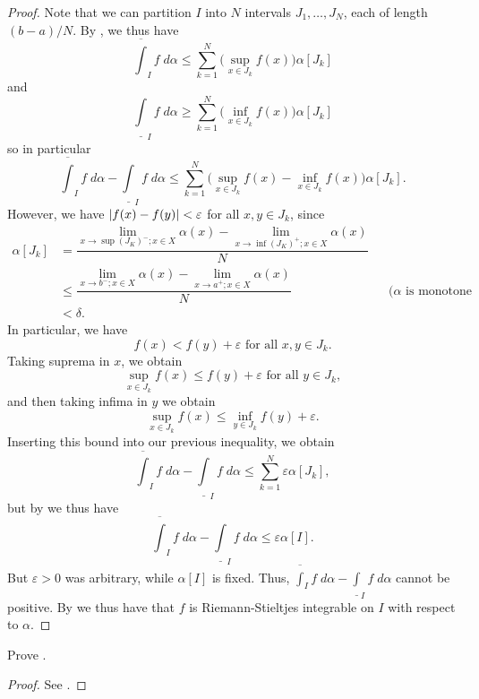 \begin{proof}
  Note that we can partition \(I\) into \(N\) intervals \(J_1, \dots, J_N\), each of length \((b - a) / N\).
  By , we thus have
  \[
    \overline{\int}_I f \; d \alpha \leq \sum_{k = 1}^N \big(\sup_{x \in J_k} f(x)\big) \alpha[J_k]
  \]
  and
  \[
    \underline{\int}_I f \; d \alpha \geq \sum_{k = 1}^N \big(\inf_{x \in J_k} f(x)\big) \alpha[J_k]
  \]
  so in particular
  \[
    \overline{\int}_I f \; d \alpha - \underline{\int}_I f \; d \alpha \leq \sum_{k = 1}^N \big(\sup_{x \in J_k} f(x) - \inf_{x \in J_k} f(x)\big) \alpha[J_k].
  \]
  However, we have \(\left\lvert f(x) - f(y)\right\rvert < \varepsilon\) for all \(x, y \in J_k\), since
  \begin{align*}
    \alpha[J_k] & = \dfrac{\lim_{x \to \sup(J_K)^- ; x \in X} \alpha(x) - \lim_{x \to \inf(J_K)^+ ; x \in X} \alpha(x)}{N}                                                 \\
                & \leq \dfrac{\lim_{x \to b^- ; x \in X} \alpha(x) - \lim_{x \to a^+ ; x \in X} \alpha(x)}{N}              &  & \text{(\(\alpha\) is monotone increasing)} \\
                & < \delta.
  \end{align*}
  In particular, we have
  \[
    f(x) < f(y) + \varepsilon \text{ for all } x, y \in J_k.
  \]
  Taking suprema in \(x\), we obtain
  \[
    \sup_{x \in J_k} f(x) \leq f(y) + \varepsilon \text{ for all } y \in J_k,
  \]
  and then taking infima in \(y\) we obtain
  \[
    \sup_{x \in J_k} f(x) \leq \inf_{y \in J_k} f(y) + \varepsilon.
  \]
  Inserting this bound into our previous inequality, we obtain
  \[
    \overline{\int}_I f \; d \alpha - \underline{\int}_I f \; d \alpha \leq \sum_{k = 1}^N \varepsilon \alpha[J_k],
  \]
  but by  we thus have
  \[
    \overline{\int}_I f \; d \alpha - \underline{\int}_I f \; d \alpha \leq \varepsilon \alpha[I].
  \]
  But \(\varepsilon > 0\) was arbitrary, while \(\alpha[I]\) is fixed.
  Thus, \(\overline{\int}_I f \; d \alpha - \underline{\int}_I f \; d \alpha\) cannot be positive.
  By  we thus have that \(f\) is Riemann-Stieltjes integrable on \(I\) with respect to \(\alpha\).
\end{proof}

\exercisesection

\begin{ex}\label{i:ex:11.8.1}
  Prove .
\end{ex}

\begin{proof}
  See .
\end{proof}

